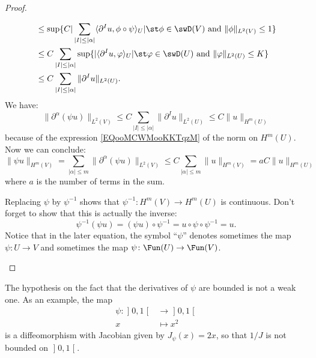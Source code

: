 \begin{proof}
\begin{subproof}
\begin{subequations}
\begin{align}
                    &\leq \sup\{ C|\sum_{| I |\leq | \alpha |}\langle \partial^Iu, \phi\circ\psi\rangle_U|\st \phi\in\swD(V)\text{ and }\| \phi \|_{L^2(V)}\leq 1 \}\\
                    &\leq C\sum_{| I |\leq | \alpha |} \sup\{ |\langle \partial^Iu, \varphi\rangle_U|\st \varphi\in\swD(U)\text{ and }\| \varphi \|_{L^2(U)}\leq K  \}\\
                    &\leq C\sum_{| I |\leq | \alpha |}\| \partial^Iu \|_{L^2(U)}.
                \end{align}
            \end{subequations}
            We have:
            \begin{equation}
                \| \partial^{\alpha}(\psi u) \|_{L^2(V)}\leq C\sum_{| I |\leq | \alpha |}\| \partial^Iu \|_{L^2(U)}\leq C\| u \|_{H^m(U)}
            \end{equation}
            because of the expression \eqref{EQooMCWMooKKTqzM} of the norm on \( H^m(U)\). Now we can conclude:
            \begin{equation}
                \| \psi u \|_{H^m(V)}=\sum_{| \alpha |\leq m}\| \partial^{\alpha}(\psi u) \|_{L^2(V)}\leq C\sum_{| \alpha |\leq m}\| u \|_{H^m(V)} = a C\| u  \|_{H^m(U)}
            \end{equation}
            where \( a\) is the number of terms in the sum.


            Replacing \( \psi\) by \( \psi^{-1}\) shows that \( \psi^{-1}\colon H^m(V)\to H^m(U)\) is continuous. Don't forget to show that this is actually the inverse:
            \begin{equation}
                \psi^{-1}(\psi u)=(\psi u)\circ \psi^{-1}=u\circ\psi\circ\psi^{-1}=u.
            \end{equation}
            Notice that in the later equation, the symbol ``$\psi$'' denotes sometimes the map \( \psi\colon U\to V\) and sometimes the map \( \psi\colon \Fun(U)\to \Fun(V)\).
    \end{subproof}
\end{proof}

\begin{remark}
    The hypothesis on the fact that the derivatives of \( \psi\) are bounded is not a weak one. As an example, the map
    \begin{equation}
        \begin{aligned}
        \psi\colon \mathopen] 0 , 1 \mathclose[&\to \mathopen] 0 , 1 \mathclose[ \\
            x&\mapsto x^2
        \end{aligned}
    \end{equation}
    is a diffeomorphism with Jacobian given by \( J_{\psi}(x)=2x\), so that \( 1/J\) is not bounded on \( \mathopen] 0 , 1 \mathclose[\).
\end{remark}

